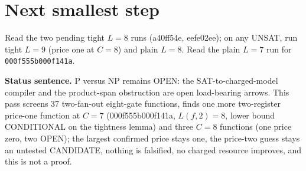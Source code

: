 \documentclass[11pt]{article}
\begin{document}
\section*{Next smallest step}
Read the two pending tight $L=8$ runs (a40ff54e, eefe02ee); on any UNSAT, run tight $L=9$ (price one at $C=8$) and plain $L=8$. Read the plain $L=7$ run for \texttt{000f555b000f141a}.

\bigskip
\noindent\textbf{Status sentence.} P versus NP remains OPEN: the SAT-to-charged-model compiler and the product-span obstruction are open load-bearing arrows. This pass screens 37 two-fan-out eight-gate functions, finds one more two-register price-one function at $C=7$ (000f555b000f141a, $L(f,2)=8$, lower bound CONDITIONAL on the tightness lemma) and three $C=8$ functions (one price zero, two OPEN); the largest confirmed price stays one, the price-two guess stays an untested CANDIDATE, nothing is falsified, no charged resource improves, and this is not a proof.
\end{document}
